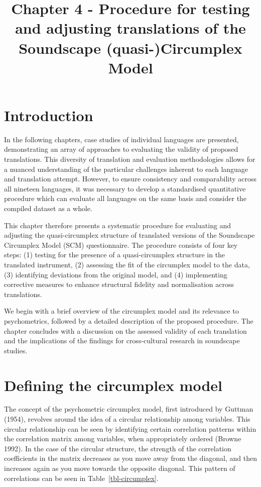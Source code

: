 \documentclass[
  default,
]{sn-jnl}
\title[Chapter 4 - Procedure for testing and adjusting translations of
the Soundscape (quasi-)Circumplex Model]{Chapter 4 - Procedure for
testing and adjusting translations of the Soundscape (quasi-)Circumplex
Model}
\author*[1]{\fnm{Andrew} \sur{Mitchell}}\email{andrew.mitchell.18@ucl.ac.uk}\author[1]{\fnm{Francesco} \sur{Aletta}}\email{f.aletta@ucl.ac.uk}
\affil[1]{\orgdiv{Institute for Environmental Design and
Engineering}, \orgname{University College
London}, \orgaddress{\street{Central House, 14 Upper Woburn
Place}, \city{London}, \postcode{WC1H 0NN}}}
\begin{document}
\maketitle


\section{Introduction}\label{introduction}

In the following chapters, case studies of individual languages are
presented, demonstrating an array of approaches to evaluating the
validity of proposed translations. This diversity of translation and
evaluation methodologies allows for a nuanced understanding of the
particular challenges inherent to each language and translation attempt.
However, to ensure consistency and comparability across all nineteen
languages, it was necessary to develop a standardised quantitative
procedure which can evaluate all languages on the same basis and
consider the compiled dataset as a whole.

This chapter therefore presents a systematic procedure for evaluating
and adjusting the quasi-circumplex structure of translated versions of
the Soundscape Circumplex Model (SCM) questionnaire. The procedure
consists of four key steps: (1) testing for the presence of a
quasi-circumplex structure in the translated instrument, (2) assessing
the fit of the circumplex model to the data, (3) identifying deviations
from the original model, and (4) implementing corrective measures to
enhance structural fidelity and normalisation across translations.

We begin with a brief overview of the circumplex model and its relevance
to psychometrics, followed by a detailed description of the proposed
procedure. The chapter concludes with a discussion on the assessed
validity of each translation and the implications of the findings for
cross-cultural research in soundscape studies.

\section{Defining the circumplex
model}\label{defining-the-circumplex-model}

The concept of the psychometric circumplex model, first introduced by
Guttman (1954), revolves around the idea of a circular relationship
among variables. This circular relationship can be seen by identifying
certain correlation patterns within the correlation matrix among
variables, when appropriately ordered (Browne 1992). In the case of the
circular structure, the strength of the correlation coefficients in the
matrix decreases as you move away from the diagonal, and then increases
again as you move towards the opposite diagonal. This pattern of
correlations can be seen in Table~\ref{tbl-circumplex}.
\end{document}
